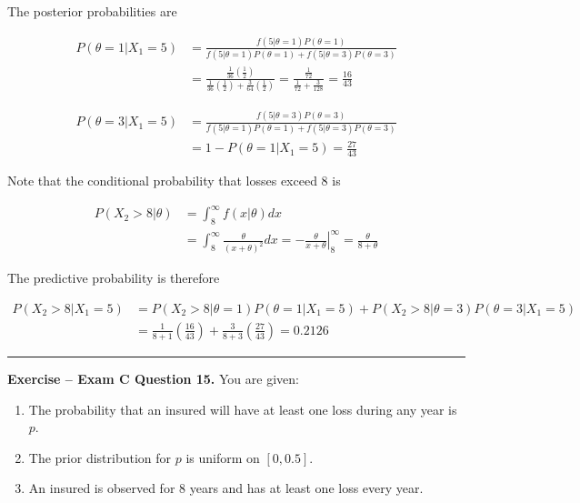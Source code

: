 \documentclass[]{book}
\providecommand{\tightlist}{%
  \setlength{\itemsep}{0pt}\setlength{\parskip}{0pt}}
\theoremstyle{definition}
\theoremstyle{definition}
\theoremstyle{definition}
\theoremstyle{remark}
\begin{document}
The posterior probabilities are

\[\begin{aligned}
P(\theta=1|X_1=5) &= \frac{f(5|\theta=1)P(\theta=1)}{f(5|\theta=1)P(\theta=1) + f(5|\theta=3)P(\theta=3)} \\
&= \frac{\frac{1}{36}(\frac{1}{2})}{\frac{1}{36}(\frac{1}{2})+\frac{3}{64}(\frac{1}{2})} = \frac{\frac{1}{72}}{\frac{1}{72} + \frac{3}{128}} = \frac{16}{43}
\end{aligned}\]

\[\begin{aligned}
P(\theta=3|X_1=5) &= \frac{f(5|\theta=3)P(\theta=3)}{f(5|\theta=1)P(\theta=1) + f(5|\theta=3)P(\theta=3)} \\
&= 1-P(\theta=1|X_1=5) = \frac{27}{43}
\end{aligned}\]

Note that the conditional probability that losses exceed 8 is

\[\begin{aligned}
P(X_2>8|\theta) &= \int_8^\infty f(x|\theta)dx \\
&= \int_8^\infty \frac{\theta}{(x+\theta)^2}dx = \left. -\frac{\theta}{x+\theta} \right|_8^\infty = \frac{\theta}{8 + \theta}
\end{aligned}\]

The predictive probability is therefore

\[\begin{aligned}
P(X_2>8|X_1=5) &= P(X_2>8|\theta=1) P(\theta=1|X_1=5) + P(X_2>8|\theta=3) P(\theta=3 | X_1=5) \\
&= \frac{1}{8+1}\left( \frac{16}{43}\right) + \frac{3}{8+3} \left( \frac{27}{43}\right) = 0.2126
\end{aligned}\]

\begin{center}\rule{0.5\linewidth}{\linethickness}\end{center}

\textbf{Exercise -- Exam C Question 15.} You are given:

\begin{enumerate}
\def\labelenumi{(\roman{enumi})}
\tightlist
\item
  The probability that an insured will have at least one loss during any
  year is \(p\).
\item
  The prior distribution for \(p\) is uniform on \([0, 0.5]\).
\item
  An insured is observed for 8 years and has at least one loss every
  year.
\end{enumerate}
\end{document}
